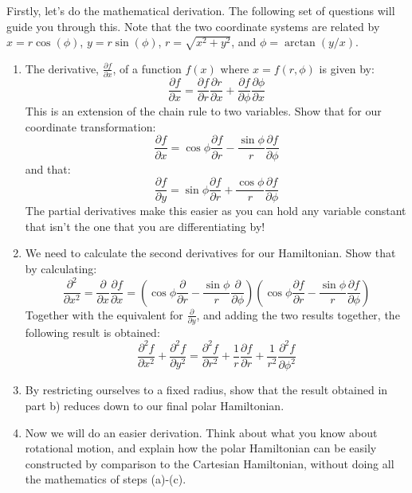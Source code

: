 \documentclass{memoir}[11pt,oneside,a4paper,openany]
\begin{document}
\begin{enumerate}
Firstly, let's do the mathematical derivation. The following set of questions will guide you through this. Note that the two coordinate systems are related by $x = r\cos(\phi)$, $y = r\sin(\phi)$, $r = \sqrt{x^2+y^2}$, and $\phi = \arctan(y/x)$.
		\begin{enumerate}
			\item The derivative, $\frac{\partial f}{\partial x}$, of a function $f(x)$ where $x=f(r,\phi)$ is given by: \begin{equation} \frac{\partial f}{\partial x} = \frac{\partial f}{\partial r}\frac{\partial r}{\partial x} + \frac{\partial f}{\partial\phi}\frac{\partial\phi}{\partial x} \end{equation} This is an extension of the chain rule to two variables. Show that for our coordinate transformation: \begin{equation} \frac{\partial f}{\partial x} = \cos\phi\frac{\partial f}{\partial r} - \frac{\sin\phi}{r}\frac{\partial f}{\partial\phi} \end{equation} and that: \begin{equation} \frac{\partial f}{\partial y} = \sin\phi\frac{\partial f}{\partial r} + \frac{\cos\phi}{r}\frac{\partial f}{\partial\phi} \end{equation}
The partial derivatives make this easier as you can hold any variable constant that isn't the one that you are differentiating by!
		\item We need to calculate the second derivatives for our Hamiltonian. Show that by calculating:
			\begin{equation}
				\frac{\partial^2}{\partial x^2} = \frac{\partial}{\partial x}\frac{\partial f}{\partial x} = (\cos\phi\frac{\partial}{\partial r}-\frac{\sin\phi}{r}\frac{\partial}{\partial\phi})(\cos\phi\frac{\partial f}{\partial r}-\frac{\sin\phi}{r}\frac{\partial f}{\partial\phi})
			\end{equation}
		Together with the equivalent for $\frac{\partial}{\partial y}$, and adding the two results together, the following result is obtained:
			\begin{equation} 
				\frac{\partial^2f}{\partial x^2} + \frac{\partial^2f}{\partial y^2} = \frac{\partial^2f}{\partial r^2} + \frac{1}{r}\frac{\partial f}{\partial r} + \frac{1}{r^2}\frac{\partial^2f}{\partial\phi^2} 
			\end{equation}
		\item By restricting ourselves to a fixed radius, show that the result obtained in part b) reduces down to our final polar Hamiltonian.
		\item Now we will do an easier derivation. Think about what you know about rotational motion, and explain how the polar Hamiltonian can be easily constructed by comparison to the Cartesian Hamiltonian, without doing all the mathematics of steps (a)-(c).
 \end{enumerate}

 \end{enumerate}
\end{document}
